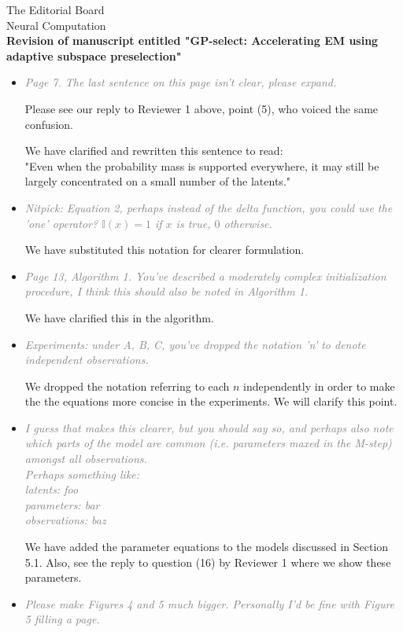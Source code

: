 \documentclass[10pt]{letter}
\newcommand{\rvr}[1]{\textcolor{gray}{#1}}
\begin{document}
\begin{letter}{
The Editorial Board\\
Neural Computation\\
\vspace{10mm}
\textbf{Revision of manuscript entitled "GP-select: Accelerating EM using adaptive
subspace preselection"}
}
\begin{itemize}[topsep=3pt,itemsep=2ex,partopsep=1ex,parsep=1ex]
    We polished the text, correcting typos.

    \item \rvr{\emph{Page 7. The last sentence on this page isn't clear, please expand.
}}

    Please see our reply to Reviewer 1 above, point (5), who voiced the same confusion.    

    We have clarified and rewritten this sentence to read: \\
    "Even when the probability mass is supported everywhere, it may still be largely concentrated on a small number of the latents."

    \item \rvr{\emph{Nitpick: Equation 2, perhaps instead of the delta function, you could use
the 'one' operator? $\mathbb{I}(x) = 1$ if $x$ is true, $0$ otherwise.}}

    We have substituted this notation for clearer formulation.


    \item \rvr{\emph{Page 13, Algorithm 1. You've described a moderately complex initialization procedure, I think this should also be noted in Algorithm 1.}}

We have clarified this in the algorithm.

    \item \rvr{\emph{Experiments: under A, B, C, you've dropped the notation 'n' to denote independent observations.}}

    We dropped the notation referring to each $n$ independently in order to make the the equations more concise in the experiments. We will clarify this point.

    \item \rvr{\emph{I guess that makes this clearer, but you should say so, and perhaps also note which parts of the model are common (i.e. parameters maxed in the M-step) amongst all observations.  \\
Perhaps something like:\\
latents: foo \\
parameters: bar\\
observations: baz}}

    We have added the parameter equations to the models discussed in Section 5.1. Also, see the reply to question (16) by Reviewer 1 where we show these parameters.


    \item \rvr{\emph{Please make Figures 4 and 5 much bigger. Personally I'd be fine with Figure 5 filling a page.}}


\end{itemize}
\end{letter}
\end{document}
